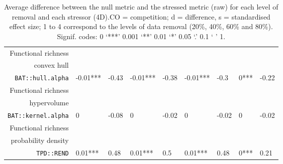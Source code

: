 \begin{table}[ht]
\begin{tabular}{rllllllll}
  Functional richness\\convex hull\\\texttt{BAT::hull.alpha} & -0.01*** & -0.43 & -0.01*** & -0.38 & -0.01*** & -0.3 & 0*** & -0.22 \\ 
  Functional richness\\hypervolume\\\texttt{BAT::kernel.alpha} & 0 & -0.08 & 0 & -0.02 & 0 & -0.02 & 0 & -0.02 \\ 
  Functional richness\\probability density\\\texttt{TPD::REND} & 0.01*** & 0.48 & 0.01*** & 0.5 & 0.01*** & 0.48 & 0*** & 0.21 \\ 
   \hline
\end{tabular}
\caption{Average difference between the null metric and the stressed metric (raw) for each level of removal and each stressor (4D).CO = competition; d = difference, s = standardised effect size; 1 to 4 correspond to the levels of data removal (20\%, 40\%, 60\% and 80\%). Signif. codes:  0 ‘***’ 0.001 ‘**’ 0.01 ‘*’ 0.05 ‘.’ 0.1 ‘ ’ 1.} 
\end{table}
